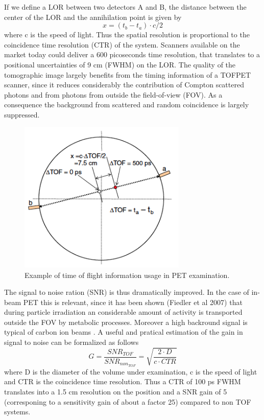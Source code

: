 If we define a LOR between two detectors A and B, the distance between the center of the LOR and the annihilation point is given by
\begin{equation}
x = (t_{b} − t_{a} ) \cdot c/2
\end{equation}
where c is the speed of light.
Thus the spatial resolution is proportional to the coincidence time resolution (CTR) of the system.
Scanners available on the market today could deliver a 600 picoseconds time resolution, that translates to a positional uncertainties of 9 cm (FWHM) on the LOR.
The quality of the tomographic image largely benefits from the timing information of a TOFPET scanner, since it reduces considerably  the contribution of Compton scattered photons and from photons from outside the field-of-view (FOV). As a consequence the background from scattered and random coincidence is largely suppressed.
\begin{figure}
\centering  
\includegraphics[width=8cm]{Pictures/Chapter_1/TOF}
\caption[TOF-PET schematics]{Example of time of flight information usage in PET examination.}
\label{fig:TOF}
\end{figure}
\newpage
The signal to noise ration (SNR) is thus dramatically improved\cite{Karp2008}.
In the case of in-beam PET this is relevant, since it has been shown (Fiedler et al 2007) that during particle irradiation an considerable amount of activity is transported outside the FOV by metabolic processes. Moreover a high backround signal is typical of carbon ion beams \cite{Enghardt2004}. 
A useful and pratical estimation of the gain in signal to noise can be formalized as follows
\begin{displaymath}
G = \frac{SNR_{TOF}}{SNR_{non_{TOF}}} = \sqrt{\frac{2\cdot D}{c \cdot CTR}}
\end{displaymath}
where D is the diameter of the volume under examination, c is the speed of light and CTR is the coincidence time resolution. Thus a CTR of 100 ps FWHM translates into a 1.5 cm resolution on the position and a SNR gain of 5 (corresponing to a sensitivity gain of about a factor 25) compared to non TOF systems.

